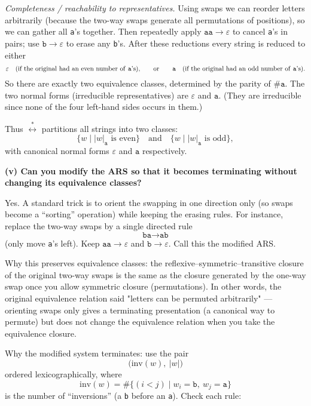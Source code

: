\documentclass{article}
\theoremstyle{plain}
\theoremstyle{definition}
\theoremstyle{remark}
\begin{document}
\emph{Completeness / reachability to representatives.} Using swaps we can reorder letters arbitrarily (because the two-way swaps generate all permutations of positions), so we can gather all \texttt{a}'s together. Then repeatedly apply \(\texttt{aa}\to\varepsilon\) to cancel \texttt{a}'s in pairs; use \(\texttt{b}\to\varepsilon\) to erase any \texttt{b}'s. After these reductions every string is reduced to either
\[
\varepsilon \quad\text{(if the original had an even number of \texttt{a}'s),}
\qquad\text{or}\qquad
\texttt{a} \quad\text{(if the original had an odd number of \texttt{a}'s).}
\]
So there are exactly two equivalence classes, determined by the parity of \(\#\texttt{a}\). The two normal forms (irreducible representatives) are \(\varepsilon\) and \(\texttt{a}\). (They are irreducible since none of the four left-hand sides occurs in them.)

Thus \(\stackrel{*}{\longleftrightarrow}\) partitions all strings into two classes:
\[
\{w\mid |w|_{\texttt{a}}\text{ is even}\}\quad\text{and}\quad\{w\mid |w|_{\texttt{a}}\text{ is odd}\},
\]
with canonical normal forms \(\varepsilon\) and \(\texttt{a}\) respectively.

\bigskip

\textbf{(v) Can you modify the ARS so that it becomes terminating without changing its equivalence classes?}

Yes. A standard trick is to orient the swapping in one direction only (so swaps become a ``sorting'' operation) while keeping the erasing rules. For instance, replace the two-way swaps by a single directed rule
\[
\texttt{ba}\longrightarrow\texttt{ab}
\]
(only move \texttt{a}'s left). Keep \(\texttt{aa}\to\varepsilon\) and \(\texttt{b}\to\varepsilon\). Call this the modified ARS.

Why this preserves equivalence classes: the reflexive–symmetric–transitive closure of the original two-way swaps is the same as the closure generated by the one-way swap once you allow symmetric closure (permutations). In other words, the original equivalence relation said "letters can be permuted arbitrarily" — orienting swaps only gives a terminating presentation (a canonical way to permute) but does not change the equivalence relation when you take the equivalence closure.

Why the modified system terminates: use the pair
\[
\big(\mathrm{inv}(w),\ |w|\big)
\]
ordered lexicographically, where
\[
\mathrm{inv}(w)=\#\{(i<j)\mid w_i=\texttt{b},\ w_j=\texttt{a}\}
\]
is the number of ``inversions'' (a \texttt{b} before an \texttt{a}). Check each rule:
\end{document}
